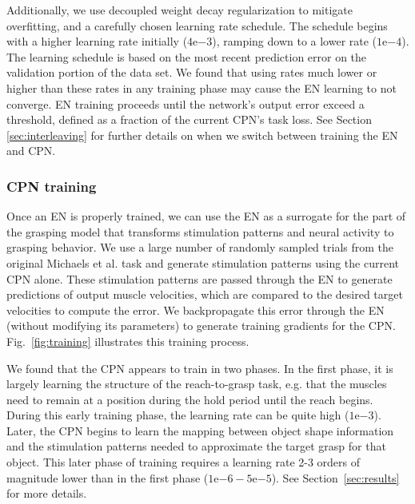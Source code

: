 \documentclass[12pt]{iopart}
\begin{document}
Additionally, we use decoupled weight decay regularization \cite{loshchilov2017decoupled} to
mitigate overfitting, and a carefully chosen learning rate schedule. The schedule begins with
a higher learning rate initially ($4\mathrm{e}{-3}$), ramping down to a lower rate ($1\mathrm{e}{-4}$).
The learning schedule is based on the most recent prediction error on the validation portion of the
data set. We found that using rates much lower or higher than these rates in any training phase
may cause the EN learning to not converge. EN training proceeds until the network's output error
exceed a threshold, defined as a fraction of the current CPN's task loss. See Section
\ref{sec:interleaving} for further details on when we switch between training the EN and CPN.

\subsubsection{CPN training}
Once an EN is properly trained, we can use the EN as a surrogate for the part of the grasping model
that transforms stimulation patterns and neural activity to grasping behavior. We use a large number
of randomly sampled trials from the original Michaels et al. task \cite{michaels.mrnn} and generate
stimulation patterns using the current CPN alone. These stimulation patterns are passed through the EN
to generate predictions of output muscle velocities, which are compared to the desired target velocities
to compute the error. We backpropagate this error through the EN (without modifying its parameters) to
generate training gradients for the CPN. Fig.~\ref{fig:training} illustrates this training process.

We found that the CPN appears to train in two phases. In the first phase, it is largely learning the structure
of the reach-to-grasp task, e.g. that the muscles need to remain at a position during the hold period until the
reach begins. During this early training phase, the learning rate can be quite high ($1\mathrm{e}{-3}$). Later, the CPN
begins to learn the mapping between object shape information and the stimulation patterns needed to approximate
the target grasp for that object. This later phase of training requires a learning rate 2-3 orders of magnitude
lower than in the first phase ($1\mathrm{e}{-6} - 5\mathrm{e}{-5}$). See Section~\ref{sec:results} for more details.
\end{document}
